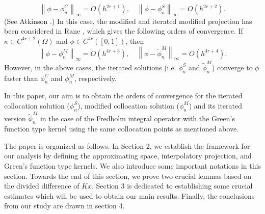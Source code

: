 \documentclass[sn-mathphys-num]{sn-jnl}%
\theoremstyle{thmstyleone}%
\theoremstyle{thmstyletwo}%
\theoremstyle{thmstylethree}%
\newcommand{\norm}[1]{\left\lVert #1\right\rVert}
\begin{document}
\begin{equation*}
	\norm{\phi - \phi_{n}^C}_\infty = O\left(h^{2r +1}\right),  \quad \norm{\phi - \phi_{n}^S}_\infty = O\left(h^{2r +2}\right).
\end{equation*}
(See Atkinson \cite[Section 3.4.3]{KEA0}.)
In this case, the modified and iterated modified projection has been considered in Rane \cite{RANE}, which gives the following orders of convergence. If $\kappa \in C^{4r + 2}(\Omega)$ and $\phi \in C^{4r}([0, 1])$, then
\begin{equation*}
	\norm{\phi - \phi_n^M }_\infty = O(h^{4r + 3}), \quad \norm{\phi - \tilde{\phi}_n^M }_\infty = O(h^{4r + 4}).
\end{equation*}
However, in the above cases, the iterated solutions (i.e. $\phi_{n}^S$ and $\tilde{\phi}_n^M$) converge to $\phi$ faster than $\phi_{n}^C$ and $\phi_{n}^M$, respectively.

In this paper, our aim is to obtain the orders of convergence for the iterated collocation solution ($\phi_{n}^S$), modified collocation solution ($\phi_n^M$) and its iterated version $\tilde{\phi}_n^M$ in the case of the Fredholm integral operator with the Green's function type kernel using the same collocation points as mentioned above. 

The paper is organized as follows. In Section 2, we establish the framework for our analysis by defining the approximating space, interpolatory projection, and Green's function type kernels. We also introduce some important notations in this section. Towards the end of this section, we prove two crucial lemmas based on the divided difference of $Kx$. Section 3 is dedicated to establishing some crucial estimates which will be used to obtain our main results. Finally, the conclusions from our study are drawn in section 4.
\end{document}
